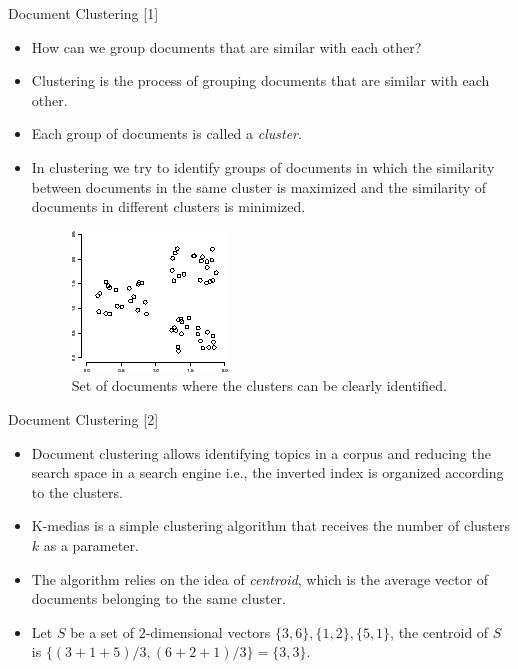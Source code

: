 \documentclass[handout]{beamer}
\begin{document}
\begin{frame}{Document Clustering [1]}
\footnotesize{
\begin{itemize}
 \item How can we group documents that are similar with each other?
 \item Clustering is the process of grouping documents that are similar with each other.
 \item Each group of documents is called a \emph{cluster}. 
 \item In clustering we try to identify groups of documents in which the similarity between documents in the same cluster is maximized and the similarity of documents in different clusters is minimized.
\begin{figure}[h!]
	\centering
	\includegraphics[scale=0.6]{pics/cluster.png}
	\caption{ Set of documents where the clusters can be clearly identified.}
\end{figure}
 
\end{itemize}


}
 
\end{frame}

\begin{frame}{Document Clustering [2]}
\footnotesize{
\begin{itemize}
 \item Document clustering allows identifying topics in a corpus and reducing the search space in a search engine i.e., the inverted index is organized according to the clusters. 
 \item K-medias is a simple clustering algorithm that receives the number of clusters $k$ as a parameter.
 \item The algorithm relies on the idea of \emph{centroid}, which is the average vector of documents belonging to the same cluster.
 \item Let $S$ be a set of $2$-dimensional vectors $\{3,6\}, \{1,2\}, \{5,1\}$, the centroid of $S$ is $\{(3+1+5)/3,(6+2+1)/3\} = \{3,3\}$.

\end{itemize}
}
\end{frame}
\end{document}

